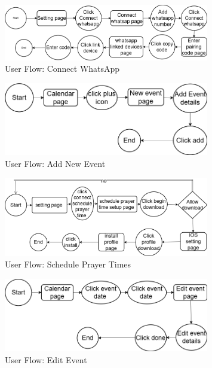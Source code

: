 \begin{figure}[H]
    \centering
    \includegraphics[width=0.8\textwidth]{images/connect whatsap.drawio.png}
    \caption{User Flow: Connect WhatsApp}
    \label{fig:userflow-connect-whatsapp}
\end{figure}

\begin{figure}[H]
    \centering
    \includegraphics[width=0.8\textwidth]{images/add event.drawio.png}
    \caption{User Flow: Add New Event}
    \label{fig:userflow-add-event}
\end{figure}

\begin{figure}[H]
    \centering
    \includegraphics[width=0.8\textwidth]{images/schedual prayer.drawio.png}
    \caption{User Flow: Schedule Prayer Times}
    \label{fig:userflow-schedule-prayer}
\end{figure}

\begin{figure}[H]
    \centering
    \includegraphics[width=0.8\textwidth]{images/Edit event.drawio.png}
    \caption{User Flow: Edit Event}
    \label{fig:userflow-edit-event}
\end{figure}

